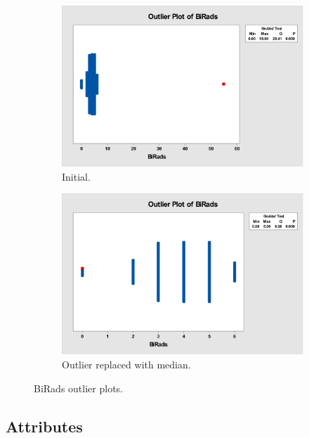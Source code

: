 \documentclass[12pt]{article}
\begin{document}
      \begin{figure}[H]
        \begin{subfigure}[b]{0.45\textwidth}
          \includegraphics[width=\textwidth]{birads-outlier-plot}
          \caption{Initial.}
          \label{fig:birads-outlier}
        \end{subfigure}
        \hfill
        \begin{subfigure}[b]{0.45\textwidth}
          \includegraphics[width=\textwidth]{birads-outlier-plot-no55}
          \caption{Outlier replaced with median.}
          \label{fig:birads-outilier-no55}
        \end{subfigure}
        \caption{BiRads outlier plots.}
      \end{figure}

  \subsection{Attributes}
\end{document}
